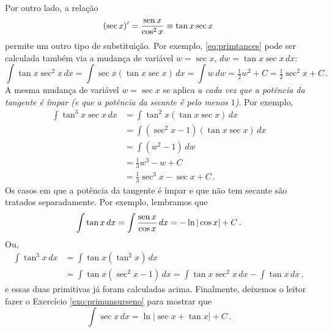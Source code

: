 Por outro lado, a relação
$$(\sec
x)'=\frac{\operatorname{sen} x}{\cos^2x}\equiv \tan x\sec x\,$$
permite um outro tipo de substituição. 
Por exemplo, \eqref{eq:primtances} pode ser calculada também via a
mudança de variável $w=\sec x$, $dw=\tan x\sec x\,dx$:
$$
\int\tan x\sec^2x\,dx=\int \sec x(\tan x\sec x)\,dx=\int w\,dw=\tfrac12 w^2+C
=\tfrac12 \sec^2x+C\,.
$$
A mesma mudança de variável $w=\sec x$ se aplica \emph{a cada vez que a potência
da tangente é ímpar (e que a potência da secante é pelo menos $1$)}. Por
exemplo,
\begin{align*}
\int  \tan^3x\sec x\,dx&=\int \tan^2 x(\tan x\sec x)\,dx\\
&=\int (\sec^2x-1) (\tan x\sec x)\,dx\\
&=\int(w^2-1)\,dw\\
&=\tfrac13 w^3-w+C\\
&=\tfrac13 \sec^3x-\sec x+C\,.
\end{align*}
Os casos em que a potência da tangente é ímpar e que não tem secante
são tratados separadamente. 
Por exemplo, lembramos que 
$$
\int \tan x\,dx=\int\frac{\operatorname{sen} x}{\cos x}\,dx=-\ln|\cos x|+C\,.
$$
Ou, 
\begin{align*}
\int \tan^3 x\,dx&=\int \tan x(\tan^2 x)\,dx\\
&=\int\tan x(\sec^2x-1)\,dx=\int \tan x \sec^2x\,dx-\int \tan x\,dx\,,
\end{align*}
e essas duas primitivas já foram calculadas acima.
Finalmente, deixemos o leitor fazer o Exercício
\ref{exo:primunsurseno} para mostrar que
$$
\int \sec x\,dx=\ln\bigl|\sec x+\tan x\bigr|+C\,.
$$
